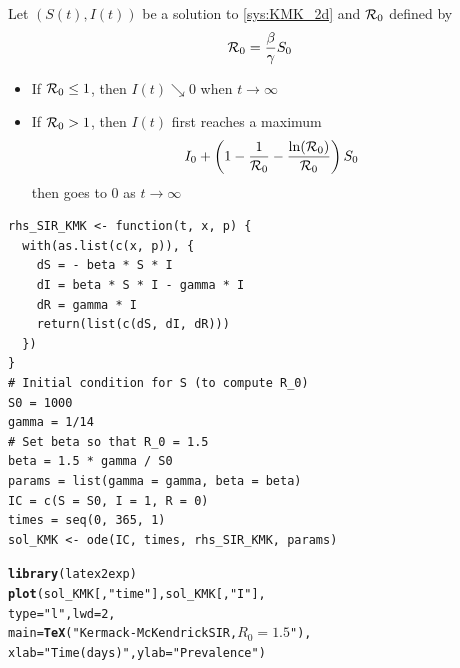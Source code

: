 \documentclass[aspectratio=169]{beamer}\usepackage[]{graphicx}\usepackage[]{xcolor}
\makeatletter
\newcommand{\hlnum}[1]{\textcolor[rgb]{0.686,0.059,0.569}{#1}}%
\newcommand{\hlsng}[1]{\textcolor[rgb]{0.192,0.494,0.8}{#1}}%
\newcommand{\hldef}[1]{\textcolor[rgb]{0.345,0.345,0.345}{#1}}%
\newcommand{\hlkwc}[1]{\textcolor[rgb]{0.333,0.667,0.333}{#1}}%
\newcommand{\hlkwd}[1]{\textcolor[rgb]{0.737,0.353,0.396}{\textbf{#1}}}%
\newenvironment{kframe}{%
 \def\at@end@of@kframe{}%
 \ifinner\ifhmode%
  \def\at@end@of@kframe{\end{minipage}}%
  \begin{minipage}{\columnwidth}%
 \fi\fi%
 \def\FrameCommand##1{\hskip\@totalleftmargin \hskip-\fboxsep
 \colorbox{shadecolor}{##1}\hskip-\fboxsep
     \hskip-\linewidth \hskip-\@totalleftmargin \hskip\columnwidth}%
 \MakeFramed {\advance\hsize-\width
   \@totalleftmargin\z@ \linewidth\hsize
   \@setminipage}}%
 {\par\unskip\endMakeFramed%
 \at@end@of@kframe}
\newenvironment{knitrout}{}{} %
\makeatother
\begin{document}
\begin{frame}{}
  \begin{theorem}
    Let $(S(t),I(t))$ be a solution to \eqref{sys:KMK_2d} and $\mathcal{R}_0$ defined by
    \begin{equation}\label{eq:R0_KMK}
    \mathcal{R}_0=\frac{\beta}{\gamma}S_0
    \end{equation}
    \vfill
    \begin{itemize}
      \item If $\mathcal{R}_0\leq 1$, then $I(t)\searrow 0$ when $t\to\infty$ 
      \item If $\mathcal{R}_0>1$, then $I(t)$ first reaches a maximum 
      \begin{equation}\label{eq:max_I}
        I_0+\left(
      1-\frac{1}{\mathcal{R}_0} - \frac{\ln(\mathcal{R}_0)}{\mathcal{R}_0}
      \right)S_0
      \end{equation}
      then goes to 0 as $t\to\infty$  
    \end{itemize}    
  \end{theorem}
\end{frame}



\begin{frame}[fragile]{}
\begin{lstlisting}
rhs_SIR_KMK <- function(t, x, p) {
  with(as.list(c(x, p)), {
    dS = - beta * S * I
    dI = beta * S * I - gamma * I
    dR = gamma * I
    return(list(c(dS, dI, dR)))
  })
}
# Initial condition for S (to compute R_0)
S0 = 1000
gamma = 1/14
# Set beta so that R_0 = 1.5
beta = 1.5 * gamma / S0 
params = list(gamma = gamma, beta = beta)
IC = c(S = S0, I = 1, R = 0)
times = seq(0, 365, 1)
sol_KMK <- ode(IC, times, rhs_SIR_KMK, params)  
\end{lstlisting}
\end{frame}

\begin{knitrout}
\color{fgcolor}\begin{kframe}
\begin{alltt}
\hlkwd{library}\hldef{(latex2exp)}
\hlkwd{plot}\hldef{(sol_KMK[,} \hlsng{"time"}\hldef{], sol_KMK[,} \hlsng{"I"}\hldef{],}
     \hlkwc{type} \hldef{=} \hlsng{"l"}\hldef{,} \hlkwc{lwd} \hldef{=} \hlnum{2}\hldef{,}
     \hlkwc{main} \hldef{=} \hlkwd{TeX}\hldef{(}\hlsng{"Kermack-McKendrick SIR, $R_0=1.5$"}\hldef{),}
     \hlkwc{xlab} \hldef{=} \hlsng{"Time (days)"}\hldef{,} \hlkwc{ylab} \hldef{=} \hlsng{"Prevalence"}\hldef{)}
\end{alltt}
\end{kframe}
\end{knitrout}
\end{document}
